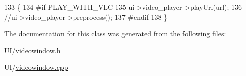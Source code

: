 \begin{DoxyCode}
133 \{
134 \textcolor{preprocessor}{#if PLAY\_WITH\_VLC}
135 \textcolor{preprocessor}{}   ui->video\_player->playUrl(url);
136     \textcolor{comment}{//ui->video\_player->preprocess();}
137 \textcolor{preprocessor}{#endif}
138 \textcolor{preprocessor}{}\}
\end{DoxyCode}


The documentation for this class was generated from the following files\-:\begin{DoxyCompactItemize}
\item 
U\-I/\hyperlink{videowindow_8h}{videowindow.\-h}\item 
U\-I/\hyperlink{videowindow_8cpp}{videowindow.\-cpp}\end{DoxyCompactItemize}
